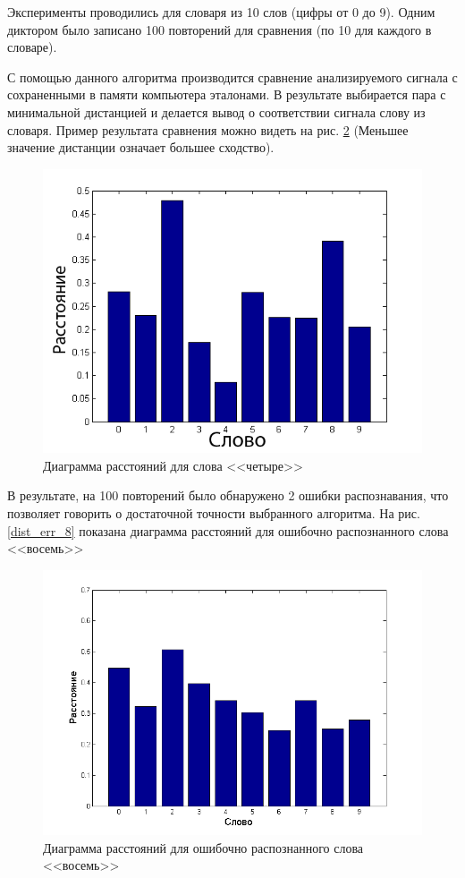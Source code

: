\documentclass[14pt,russian,utf8,nocolumnsxix]{extarticle}
\begin{document}
Эксперименты проводились для словаря из 10 слов (цифры от 0 до 9). Одним диктором было записано 100 повторений для сравнения (по 10 для каждого в словаре).


С помощью данного алгоритма производится сравнение анализируемого сигнала с сохраненными в памяти компьютера эталонами. В результате выбирается пара с минимальной дистанцией и делается вывод о соответствии сигнала слову из словаря. Пример результата сравнения можно видеть на рис. \ref{distances_4} (Меньшее значение дистанции означает большее сходство).

\begin{figure}[H]	
	\centering
	\includegraphics[width=120mm]{distances_4.png}			
	\caption{Диаграмма расстояний для слова <<четыре>>}
	\label{distances_4}
\end{figure}

В результате, на 100 повторений было обнаружено 2 ошибки распознавания, что позволяет говорить о достаточной точности выбранного алгоритма. На рис. \ref{dist_err_8} показана диаграмма расстояний для ошибочно распознанного слова <<восемь>>

\begin{figure}[H]	
	\centering
	\includegraphics[width=120mm]{err_8.png}			
	\caption{Диаграмма расстояний для ошибочно распознанного слова <<восемь>>}
	\label{distances_4}
\end{figure}
\end{document}
